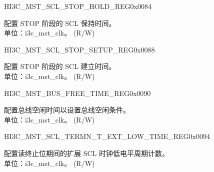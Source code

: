 \begin{register}{H}{I3C\_MST\_SCL\_STOP\_HOLD\_REG}{0x0084}\label{regdesc:I3CMSTSCLSTOPHOLDREG}
%
%
\regnewline%
\begin{regdesc}\begin{reglist}
\label{fielddesc:I3CMSTREGSCLSTOPHOLDTIME}\item [I3C\_MST\_REG\_SCL\_STOP\_HOLD\_TIME] 配置 STOP 阶段的 SCL 保持时间。\\
单位：i3c\_mst\_clk。 (R/W)
\end{reglist}\end{regdesc}
\end{register}


\begin{register}{H}{I3C\_MST\_SCL\_STOP\_SETUP\_REG}{0x0088}\label{regdesc:I3CMSTSCLSTOPSETUPREG}
%
%
\regnewline%
\begin{regdesc}\begin{reglist}
\label{fielddesc:I3CMSTREGSCLSTOPSETUPTIME}\item [I3C\_MST\_REG\_SCL\_STOP\_SETUP\_TIME] 配置 STOP 阶段的 SCL 建立时间。\\
单位：i3c\_mst\_clk。 (R/W)
\end{reglist}\end{regdesc}
\end{register}


\begin{register}{H}{I3C\_MST\_BUS\_FREE\_TIME\_REG}{0x0090}\label{regdesc:I3CMSTBUSFREETIMEREG}
%
%
\regnewline%
\begin{regdesc}\begin{reglist}
\label{fielddesc:I3CMSTREGBUSFREETIME}\item [I3C\_MST\_REG\_BUS\_FREE\_TIME] 配置总线空闲时间以设置总线空闲条件。\\
单位：i3c\_mst\_clk。 (R/W)
\end{reglist}\end{regdesc}
\end{register}


\begin{register}{H}{I3C\_MST\_SCL\_TERMN\_T\_EXT\_LOW\_TIME\_REG}{0x0094}\label{regdesc:I3CMSTSCLTERMNTEXTLOWTIMEREG}
%
%
\regnewline%
\begin{regdesc}\begin{reglist}
\label{fielddesc:I3CMSTREGI3CMSTTERMNTEXTLOWTIME}\item [I3C\_MST\_REG\_I3C\_MST\_TERMN\_T\_EXT\_LOW\_TIME] 配置读终止位期间的扩展 SCL 时钟低电平周期计数。\\
单位：i3c\_mst\_clk。 (R/W)
\end{reglist}\end{regdesc}
\end{register}


